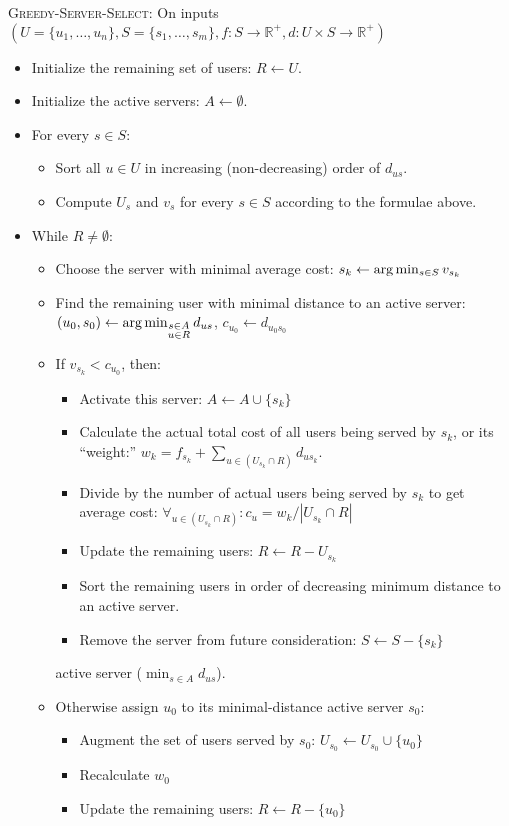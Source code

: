 \documentclass[12pt]{article}
\def\argmin{{\rm arg} \mathop{\rm {min}}}
\begin{document}
\textsc{Greedy-Server-Select}: On inputs\\
$(U = \{u_1,\ldots,u_n\}, S = \{s_1,\ldots,s_m\}, f:S\rightarrow \mathbb{R}^+, d:U \times S \rightarrow \mathbb{R}^+)$
\begin{itemize}
\item Initialize the remaining set of users: $R \gets U$.
\item Initialize the active servers: $A \gets \emptyset$.
\item For every $s \in S$:
\begin{itemize}
\item Sort all $u \in U$ in increasing (non-decreasing) order of $d_{us}$.
\item Compute $U_s$ and $v_s$ for every $s \in S$ according to the formulae above.
\end{itemize}
\item While $R \ne \emptyset$:
\begin{itemize}
\item Choose the server with minimal average cost: $s_k \gets \argmin_{s \in S} v_{s_k}$
\item Find the remaining user with minimal distance to an active server:
$(u_0, s_0) \gets \argmin_{\begin{subarray}{c} s \in A\\ u \in R \end{subarray}} d_{us}$,
$c_{u_0} \gets d_{u_0s_0}$
\item If $v_{s_k} < c_{u_0}$, then:
\begin{itemize}
\item Activate this server: $A \gets A \cup \{s_k\}$
\item Calculate the actual total cost of all users being served by $s_k$, or its ``weight:'' $w_k = f_{s_k} + \sum_{u \in (U_{s_k} \cap R)} d_{us_k}$.
\item Divide by the number of actual users being served by $s_k$ to get
average cost: $\forall_{u \in (U_{s_k} \cap R)}: c_u = w_k / |U_{s_k} \cap R|$
\item Update the remaining users: $R \gets R - U_{s_k}$
\item Sort the remaining users in order of decreasing minimum distance to an
active server.
\item Remove the server from future consideration: $S \gets S - \{s_k\}$
\end{itemize}
active server ($\min_{s \in A} d_{us}$).
\item Otherwise assign $u_0$ to its minimal-distance active server $s_0$:
\begin{itemize}
\item Augment the set of users served by $s_0$: $U_{s_0} \gets U_{s_0} \cup \{u_0\}$
\item Recalculate $w_0$
\item Update the remaining users: $R \gets R - \{u_0\}$
\end{itemize}
\end{itemize}
\end{itemize}
\end{document}
